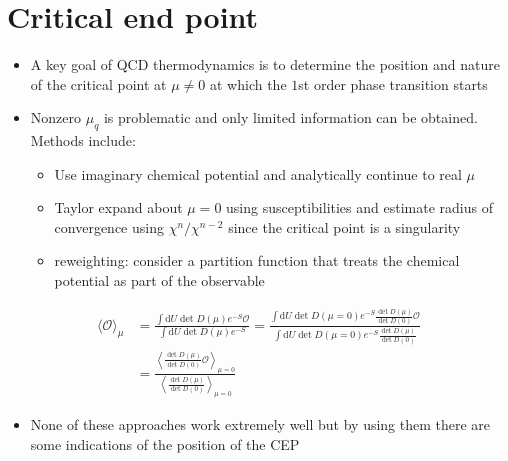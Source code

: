 \section{Critical end point}

\begin{itemize}
    \item A key goal of QCD thermodynamics is to determine the position and nature of the critical point at $\mu \neq 0$ at which the $1$st order phase transition starts
    \item Nonzero $\mu_q$ is problematic and only limited information can be obtained. Methods include:
    \begin{itemize}
        \item Use imaginary chemical potential and analytically continue to real $\mu$
        \item Taylor expand about $\mu = 0$ using susceptibilities and estimate radius of convergence using $\chi^n/\chi^{n-2}$ since the critical point is a singularity
        \item reweighting: consider a partition function that treats the chemical potential as part of the observable
    \end{itemize}
\end{itemize}
\begin{align}
    \langle \mathcal{O} \rangle_\mu &= \frac{\int \text{d} U \operatorname{det} D(\mu) e^{-S} \mathcal{O}}{\int \text{d} U \operatorname{det} D(\mu) e^{-S}} = \frac{\int \text{d} U \operatorname{det} D(\mu=0) e^{-S} \frac{\operatorname{det}D(\mu)}{\operatorname{det}D(0)} \mathcal{O}}{\int \text{d} U \operatorname{det} D(\mu=0) e^{-S} \frac{\operatorname{det}D(\mu)}{\operatorname{det}D(0)} } \nonumber \\
    &= \frac{\left \langle \frac{\operatorname{det}D(\mu)}{\operatorname{det}D(0)} \mathcal{O}\right \rangle_{\mu=0}}{\left \langle \frac{\operatorname{det}D(\mu)}{\operatorname{det}D(0)} \right \rangle_{\mu=0}}
\end{align}
\begin{itemize}
    \item None of these approaches work extremely well but by using them there are some indications of the position of the CEP
\end{itemize}

